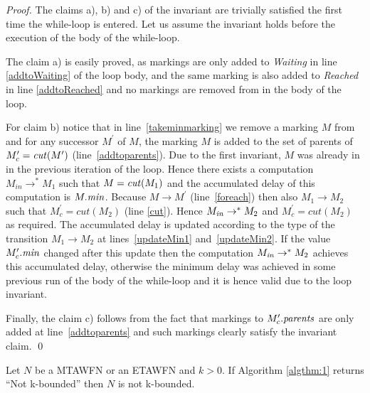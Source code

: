 \begin{proof}%
	The claims a), b) and c) of the invariant are trivially satisfied the first time the while-loop is entered. 
	Let us assume the invariant holds before the execution of the body of the while-loop. 
	
	The claim a) is easily proved, as markings are only added to \emph{Waiting} in line \ref{addtoWaiting} of the loop body, 
	and the same marking is also added to \emph{Reached} in line \ref{addtoReached} and no markings are removed from  in the body of the loop.
	
	For claim b) notice that in line~\ref{takeminmarking} we remove 
        a marking $M$ from  and for any successor $M^\prime$ of 
        $M$, the marking $M$ is added to the set of parents of 
        $M^\prime_c = \mathit{cut}(M^\prime)$ (line~\ref{addtoparents}). 
	Due to the first invariant, $M$ was already in  
        in the previous iteration of the loop.
	Hence there exists a computation $M_{in} \rightarrow^* M_1$
        such that $M = \mathit{cut}(M_1)$ and the accumulated delay of this
        computation is $M.{\mathit{min}}$.
        Because $M \rightarrow M^\prime$ (line~\ref{foreach}) then 
        also $M_1 \rightarrow M_2$ 
	such that $M^\prime_c=cut(M_2)$ (line \ref{cut}).
        Hence $M_{{\mathit{in}}} \rightarrow^* M_2$  and $M^\prime_c=cut(M_2)$
        as required. The accumulated delay is updated according to the
        type of the transition $M_1 \rightarrow M_2$ at
        lines~\ref{updateMin1} and~\ref{updateMin2}. If the value
        $M'_c.{\mathit{min}}$ changed after this update then the computation
        $M_{{\mathit{in}}} \rightarrow^* M_2$ achieves this accumulated delay,
        otherwise the minimum delay was achieved in some previous
        run of the body of the while-loop and it is hence valid due 
        to the loop invariant.  

Finally, the claim c) follows from the fact that markings
to $M'_c.{\mathit{parents}}$ are only added at line~\ref{addtoparents} and
such markings clearly satisfy the invariant claim.
\qed
\end{proof}

\begin{lemma}
	\label{algthm:1:notkbounded}
	Let $N$ be a MTAWFN or an ETAWFN and $k > 0$. If Algorithm \ref{algthm:1} returns ``Not k-bounded'' then  $N$ is not k-bounded. 
\end{lemma}

